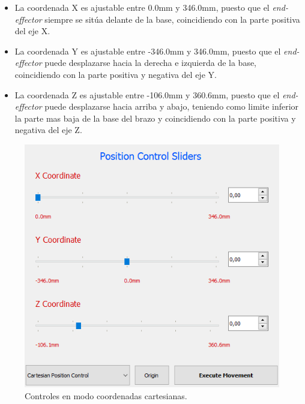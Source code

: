 \begin{itemize}
        \begin{itemize}
            \item La coordenada X es ajustable entre 0.0mm y 346.0mm, puesto que el \textit{end-effector} siempre se sitúa delante de la base, coincidiendo con la parte positiva del eje X. 
            \item La coordenada Y es ajustable entre -346.0mm y 346.0mm, puesto que el \textit{end-effector} puede desplazarse hacia la derecha e izquierda de la base, coincidiendo con la parte positiva y negativa del eje Y.
            \item La coordenada Z es ajustable entre -106.0mm y 360.6mm, puesto que el \textit{end-effector} puede desplazarse hacia arriba y abajo, teniendo como limite inferior la parte mas baja de la base del brazo y coincidiendo con la parte positiva  y negativa del eje Z.
        \end{itemize}
        \begin{figure}[H]
            \centering
            \includegraphics[width=0.55\linewidth]{pictures/Cartesian_Gui.PNG}
            \caption{Controles en modo coordenadas cartesianas.}
            \label{fig:ui_cartesian}
        \end{figure}
    \end{itemize}

